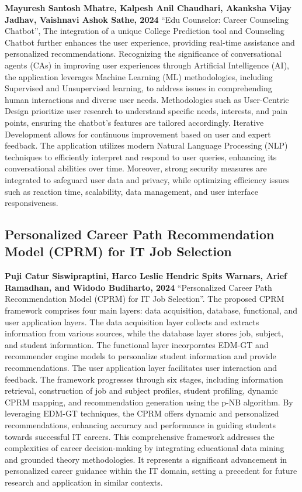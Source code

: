 \textbf{Mayuresh Santosh Mhatre, Kalpesh Anil Chaudhari, Akanksha Vijay Jadhav, Vaishnavi Ashok Sathe, 2024}
“Edu Counselor: Career Counseling Chatbot”, The integration of a unique College Prediction tool and Counseling Chatbot further enhances the user experience, providing real-time assistance and personalized recommendations. Recognizing the significance of conversational agents (CAs) in improving user experiences through Artificial Intelligence (AI), the application leverages Machine Learning (ML) methodologies, including Supervised and Unsupervised learning, to address issues in comprehending human interactions and diverse user needs. Methodologies such as User-Centric Design prioritize user research to understand specific needs, interests, and pain points, ensuring the chatbot's features are tailored accordingly. Iterative Development allows for continuous improvement based on user and expert feedback. The application utilizes modern Natural Language Processing (NLP) techniques to efficiently interpret and respond to user queries, enhancing its conversational abilities over time. Moreover, strong security measures are integrated to safeguard user data and privacy, while optimizing efficiency issues such as reaction time, scalability, data management, and user interface responsiveness.

\subsection{Personalized Career Path Recommendation Model (CPRM) for IT Job Selection}

\textbf{Puji Catur Siswipraptini, Harco Leslie Hendric Spits Warnars, Arief Ramadhan, and Widodo Budiharto, 2024} “Personalized Career Path Recommendation Model (CPRM) for IT Job Selection”. The proposed CPRM framework comprises four main layers: data acquisition, database, functional, and user application layers. The data acquisition layer collects and extracts information from various sources, while the database layer stores job, subject, and student information. The functional layer incorporates EDM-GT and recommender engine models to personalize student information and provide recommendations. The user application layer facilitates user interaction and feedback. The framework progresses through six stages, including information retrieval, construction of job and subject profiles, student profiling, dynamic CPRM mapping, and recommendation generation using the p-NB algorithm. By leveraging EDM-GT techniques, the CPRM offers dynamic and personalized recommendations, enhancing accuracy and performance in guiding students towards successful IT careers. This comprehensive framework addresses the complexities of career decision-making by integrating educational data mining and grounded theory methodologies. It represents a significant advancement in personalized career guidance within the IT domain, setting a precedent for future research and application in similar contexts.

